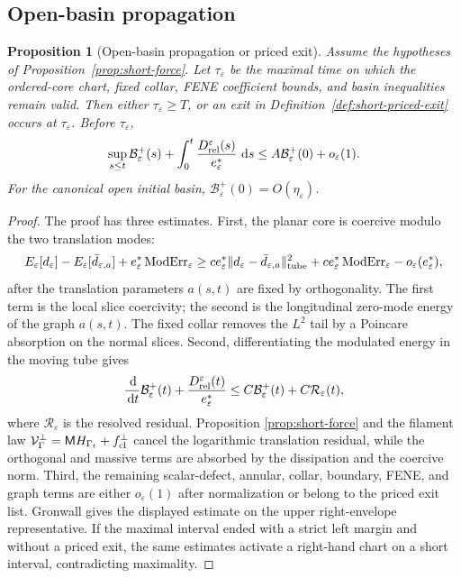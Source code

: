 \documentclass[11pt]{article}
\newtheorem{proposition}[theorem]{Proposition}
\theoremstyle{definition}
\newcommand{\dd}{\,\mathrm d}
\newcommand{\eps}{\varepsilon}
\newcommand{\estar}{e_\varepsilon^\ast}
\newcommand{\Basin}{\mathcal B}
\newcommand{\Mmob}{\mathsf M}
\newcommand{\Vrel}{\mathcal V}
\begin{document}
\subsection{Open-basin propagation}

\begin{proposition}[Open-basin propagation or priced exit]
\label{prop:short-open-basin}
Assume the hypotheses of Proposition~\ref{prop:short-force}.  Let
\(\tau_\eps\) be the maximal time on which the ordered-core chart, fixed collar,
FENE coefficient bounds, and basin inequalities remain valid.  Then either
\(\tau_\eps\ge T\), or an exit in Definition~\ref{def:short-priced-exit} occurs
at \(\tau_\eps\).  Before \(\tau_\eps\),
\[
        \sup_{s\le t}\Basin_\eps^+(s)
        +
        \int_0^t
        \frac{D_{\rm rel}^\eps(s)}{\estar}\,\dd s
        \le
        A\Basin_\eps^+(0)+o_\eps(1).
\]
For the canonical open initial basin, \(\Basin_\eps^+(0)=O(\eta_\eps)\).
\end{proposition}

\begin{proof}
The proof has three estimates.  First, the planar core is coercive modulo the
two translation modes:
\[
        E_\eps[d_\eps]-E_\eps[\bar d_{\eps,a}]
        +
        \estar\,{\rm ModErr}_\eps
        \ge
        c\estar\|d_\eps-\bar d_{\eps,a}\|_{\rm tube}^2
        +
        c\estar\,{\rm ModErr}_\eps
        -
        o_\eps(\estar),
\]
after the translation parameters \(a(s,t)\) are fixed by orthogonality.  The
first term is the local slice coercivity; the second is the longitudinal
zero-mode energy of the graph \(a(s,t)\).  The fixed collar removes the
\(L^2\) tail by a Poincare absorption on the normal slices.  Second,
differentiating the modulated energy in the moving tube gives
\[
        \frac{\dd}{\dd t}\Basin_\eps^+(t)
        +
        \frac{D_{\rm rel}^\eps(t)}{\estar}
        \le
        C\Basin_\eps^+(t)
        +
        C\mathcal R_\eps(t),
\]
where \(\mathcal R_\eps\) is the resolved residual.  Proposition
\ref{prop:short-force} and the filament law
\(\Vrel_\Gamma^\perp=\Mmob H_{\Gamma_t}+f_{\rm cl}^\perp\) cancel the logarithmic
translation residual, while the orthogonal and massive terms are absorbed by
the dissipation and the coercive norm.  Third, the remaining scalar-defect,
annular, collar, boundary, FENE, and graph terms are either \(o_\eps(1)\) after
normalization or belong to the priced exit list.  Gronwall gives the displayed
estimate on the upper right-envelope representative.  If the maximal interval
ended with a strict left margin and without a priced exit, the same estimates
activate a right-hand chart on a short interval, contradicting maximality.
\end{proof}
\end{document}
